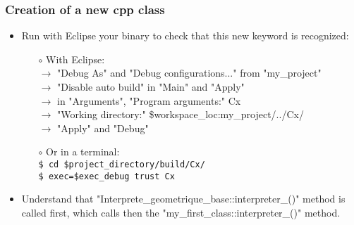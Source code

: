 \documentclass[10pt, hyperref={unicode=true,pdfusetitle, bookmarks=true,bookmarksnumbered=false,bookmarksopen=false, breaklinks=false,pdfborder={0 0 1},backref=true,colorlinks=true,linkcolor=darkblue,pageanchor, urlcolor=darkblue}]{beamer}
\begin{document}
\begin{frame}
\frametitle{Creation of a new cpp class}
\begin{block}{}

\begin{itemize}
\item Run with Eclipse your binary to check that this new keyword is recognized:\\
    \begin{itemize}
    \item [$\circ$] With Eclipse:\\
    $\rightarrow$ "Debug As" and "Debug configurations..." from "my\_project"\\
    $\rightarrow$ "Disable auto build" in "Main" and "Apply"\\
    $\rightarrow$ in "Arguments", "Program arguments:" Cx\\
    $\rightarrow$ "Working directory:" \${workspace\_loc:my\_project}/../Cx/\\
    $\rightarrow$ "Apply" and "Debug"\\
    \item [$\circ$] Or in a terminal:\\
    \texttt{\$ cd \$project\_directory/build/Cx/}\\
    \texttt{\$ exec=\$exec\_debug trust Cx}\\
    \end{itemize}

\item Understand that "Interprete\_geometrique\_base::interpreter\_()" method is called first,
which calls then the "my\_first\_class::interpreter\_()" method.
\end{itemize}

\end{block}
\end{frame}
\end{document}
